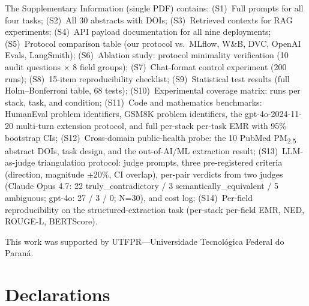 \documentclass[sn-nature]{sn-jnl}
\begin{document}
The Supplementary Information (single PDF) contains:
(S1)~Full prompts for all four tasks;
(S2)~All 30 abstracts with DOIs;
(S3)~Retrieved contexts for RAG experiments;
(S4)~API payload documentation for all nine deployments;
(S5)~Protocol comparison table (our protocol vs.\ MLflow, W\&B, DVC, OpenAI Evals, LangSmith);
(S6)~Ablation study: protocol minimality verification (10 audit questions $\times$ 8 field groups);
(S7)~Chat-format control experiment (200 runs);
(S8)~15-item reproducibility checklist;
(S9)~Statistical test results (full Holm--Bonferroni table, 68 tests);
(S10)~Experimental coverage matrix: runs per stack, task, and condition;
(S11)~Code and mathematics benchmarks: HumanEval problem identifiers, GSM8K problem identifiers, the gpt-4o-2024-11-20 multi-turn extension protocol, and full per-stack per-task EMR with 95\% bootstrap CIs;
(S12)~Cross-domain public-health probe: the 10 PubMed PM\textsubscript{2.5} abstract DOIs, task design, and the out-of-AI/ML extraction result;
(S13)~LLM-as-judge triangulation protocol: judge prompts, three pre-registered criteria (direction, magnitude $\pm$20\%, CI overlap), per-pair verdicts from two judges (Claude Opus 4.7: 22 truly\_contradictory / 3 semantically\_equivalent / 5 ambiguous; gpt-4o: 27 / 3 / 0; N=30), and cost log;
(S14)~Per-field reproducibility on the structured-extraction task (per-stack per-field EMR, NED, ROUGE-L, BERTScore).


This work was supported by UTFPR---Universidade Tecnol\'ogica Federal do Paran\'a.

\section*{Declarations}
\end{document}
